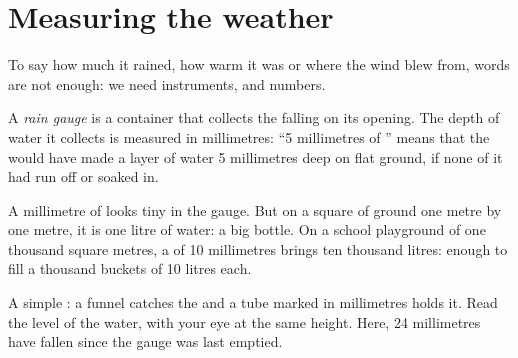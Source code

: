 \section{Measuring the weather}

To say how much it rained, how warm it was or where the wind blew from,
words are not enough: we need instruments, and numbers.

\begin{definition}\label{def:g4:clouds-rain-snow:rain-gauge}
A \emph{rain gauge} is a container that collects the 
falling on its opening. The depth of water it collects is measured in
millimetres: ``5 millimetres of '' means that the  would have made
a layer of water 5 millimetres deep on flat ground, if none of it had run
off or soaked in.
\end{definition}

\begin{remark}\label{rem:g4:clouds-rain-snow:litre}
A millimetre of  looks tiny in the gauge. But on a square of ground one
metre by one metre, it is one litre of water: a big bottle. On a school
playground of one thousand square metres, a  of 10 millimetres brings
ten thousand litres: enough to fill a thousand buckets of 10 litres each.
\end{remark}

\begin{omfigure}

{\small A simple : a funnel catches the  and a tube marked in
millimetres holds it. Read the level of the water, with your eye at the
same height. Here, 24 millimetres have fallen since the gauge was last
emptied.}
\label{fig:g4:clouds-rain-snow:gauge}
\end{omfigure}


